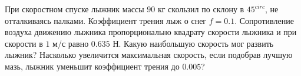 При скоростном спуске лыжник массы $90$ кг скользил по склону в
$45^{circ}$, не отталкиваясь палками. Коэффициент трения лыж о снег
$f=0.1$. Сопротивление воздуха движению лыжника пропорционально квадрату
скорости лыжника и при скорости в $1$ м/с равно $0.635$ Н. Какую
наибольшую скорость мог развить лыжник? Насколько увеличится
максимальная скорость, если подобрав лучшую мазь, лыжник уменьшит
коэффициент трения до $0.005$?
